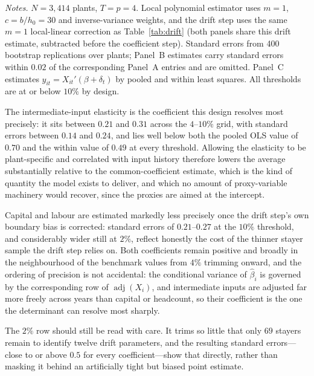 \documentclass{article}
\begin{document}
\begin{table}[t]
\vspace{0.6em}
\begin{minipage}{0.92\textwidth}
\footnotesize \emph{Notes.} $N = 3{,}414$ plants, $T = p = 4$. Local polynomial
estimator uses $m = 1$, $c = b/h_0 = 30$ and inverse-variance weights, and the
drift step uses the same $m=1$ local-linear correction as Table~\ref{tab:drift}
(both panels share this drift estimate, subtracted before the coefficient
step). Standard errors from 400 bootstrap replications over plants; Panel~B
estimates carry standard errors within $0.02$ of the corresponding Panel~A
entries and are omitted. Panel~C estimates
$y_{it} = X_{it}'(\beta + \delta_t)$ by pooled and within least squares. All
thresholds are at or below $10\%$ by design.
\end{minipage}
\end{table}

The intermediate-input elasticity is the coefficient this design resolves
most precisely: it sits between $0.21$ and $0.31$ across the $4$--$10\%$
grid, with standard errors between $0.14$ and $0.24$, and lies well below
both the pooled OLS value of $0.70$ and the within value of $0.49$ at every
threshold. Allowing the elasticity to be plant-specific and correlated with
input history therefore lowers the average substantially relative to the
common-coefficient estimate, which is the kind of quantity the model exists
to deliver, and which no amount of proxy-variable machinery would recover,
since the proxies are aimed at the intercept.

Capital and labour are estimated markedly less precisely once the drift
step's own boundary bias is corrected: standard errors of $0.21$--$0.27$ at
the $10\%$ threshold, and considerably wider still at $2\%$, reflect
honestly the cost of the thinner stayer sample the drift step relies on.
Both coefficients remain positive and broadly in the neighbourhood of the
benchmark values from $4\%$ trimming onward, and the ordering of precision is
not accidental: the conditional variance of $\hat\beta_i$ is governed by the
corresponding row of $\operatorname{adj}(X_i)$, and intermediate inputs are
adjusted far more freely across years than capital or headcount, so their
coefficient is the one the determinant can resolve most sharply.

The $2\%$ row should still be read with care. It trims so little that only
$69$ stayers remain to identify twelve drift parameters, and the resulting
standard errors---close to or above $0.5$ for every coefficient---show that
directly, rather than masking it behind an artificially tight but biased
point estimate.
\end{document}
